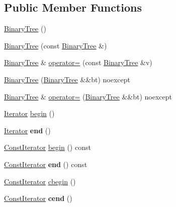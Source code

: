 \subsection*{Public Member Functions}
\begin{DoxyCompactItemize}
\item 
\mbox{\hyperlink{classBinaryTree_a18b4981a8d885a296b144462729c0679}{Binary\+Tree}} ()
\item 
\mbox{\hyperlink{classBinaryTree_a8cfb4f89d47accb81042824dca065946}{Binary\+Tree}} (const \mbox{\hyperlink{classBinaryTree}{Binary\+Tree}} \&)
\item 
\mbox{\hyperlink{classBinaryTree}{Binary\+Tree}} \& \mbox{\hyperlink{classBinaryTree_ad954acd76e1ad805b1bc8b7964dd9a58}{operator=}} (const \mbox{\hyperlink{classBinaryTree}{Binary\+Tree}} \&v)
\item 
\mbox{\hyperlink{classBinaryTree_a22a4831494c378f556151e321cdf917b}{Binary\+Tree}} (\mbox{\hyperlink{classBinaryTree}{Binary\+Tree}} \&\&bt) noexcept
\item 
\mbox{\hyperlink{classBinaryTree}{Binary\+Tree}} \& \mbox{\hyperlink{classBinaryTree_a6a3f46892900021d0e7304d762c47af8}{operator=}} (\mbox{\hyperlink{classBinaryTree}{Binary\+Tree}} \&\&bt) noexcept
\item 
\mbox{\hyperlink{classBinaryTree_1_1Iterator}{Iterator}} \mbox{\hyperlink{classBinaryTree_a828acf65e70cf4b6e106807a052ca508}{begin}} ()
\item 
\mbox{\label{classBinaryTree_af27fde669bad584ff4bc399be81d93b7}} 
\mbox{\hyperlink{classBinaryTree_1_1Iterator}{Iterator}} {\bfseries end} ()
\item 
\mbox{\hyperlink{classBinaryTree_1_1ConstIterator}{Const\+Iterator}} \mbox{\hyperlink{classBinaryTree_aaf9049aa9e91bed50e9543b6db442d80}{begin}} () const
\item 
\mbox{\label{classBinaryTree_ace2351a2760c864d97fd61878cc348a6}} 
\mbox{\hyperlink{classBinaryTree_1_1ConstIterator}{Const\+Iterator}} {\bfseries end} () const
\item 
\mbox{\hyperlink{classBinaryTree_1_1ConstIterator}{Const\+Iterator}} \mbox{\hyperlink{classBinaryTree_afc1bfd2d748acb391605ffcf8c86439d}{cbegin}} ()
\item 
\mbox{\label{classBinaryTree_a503645b7d06f1c24ba25042d3e1987b5}} 
\mbox{\hyperlink{classBinaryTree_1_1ConstIterator}{Const\+Iterator}} {\bfseries cend} ()

\end{DoxyCompactItemize}
